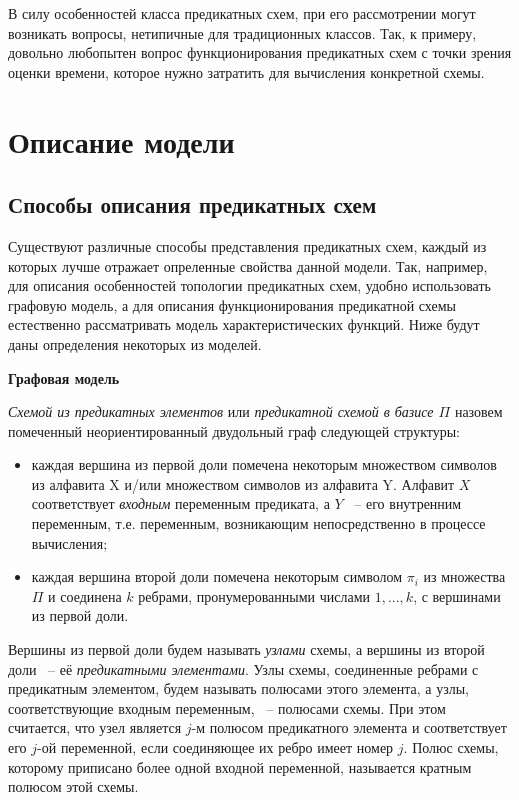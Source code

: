 \documentclass[12pt]{article}
\newenvironment{definition}[1][Определение]{\begin{trivlist}
\item[\hskip \labelsep {\bfseries #1}]}{\end{trivlist}}
\begin{document}
В силу особенностей класса предикатных схем, при его рассмотрении могут возникать вопросы,
нетипичные для традиционных классов. Так, к примеру, довольно любопытен вопрос функционирования предикатных схем с точки зрения оценки времени, которое нужно затратить для
вычисления конкретной схемы. 

\clearpage
\section{Описание модели}

\subsection{Способы описания предикатных схем}
Существуют различные способы представления предикатных схем, каждый из которых лучше отражает опреленные свойства данной 
модели. Так, например, для описания особенностей топологии предикатных схем, удобно использовать графовую модель, 
а для описания функционирования предикатной схемы естественно рассматривать модель 
характеристических функций. Ниже будут даны определения некоторых из моделей.

\textbf{Графовая модель}

\begin{definition}
\textit{Схемой из предикатных элементов} или \textit{предикатной схемой в базисе $\Pi$} назовем помеченный
неориентированный двудольный граф следующей структуры:

\begin{itemize}
\item каждая вершина из первой доли помечена некоторым множеством символов из алфавита X и/или 
множеством символов из алфавита Y. 
Алфавит $X$ соответствует \textit{входным} переменным предиката, а $Y$ ~-- его внутренним переменным, 
т.е. переменным, возникающим непосредственно в процессе вычисления; 

\item каждая вершина второй доли помечена некоторым символом $\pi_i$ из множества $\Pi$ и 
соединена $k$ ребрами, пронумерованными числами $1, ..., k$, с вершинами из первой доли.
\end{itemize}
\end{definition}

Вершины из первой доли будем называть \textit{узлами} схемы, а вершины из второй доли ~-- её \textit{предикатными элементами}. 
Узлы схемы, соединенные ребрами с предикатным элементом, будем называть полюсами этого элемента, 
а узлы, соответствующие входным переменным, ~-- полюсами схемы.
При этом считается, что узел является $j$-м полюсом предикатного элемента и соответствует 
его $j$-ой переменной, если соединяющее их ребро имеет номер $j$. Полюс схемы, которому приписано 
более одной входной переменной, называется кратным полюсом этой схемы. 
\end{document}

